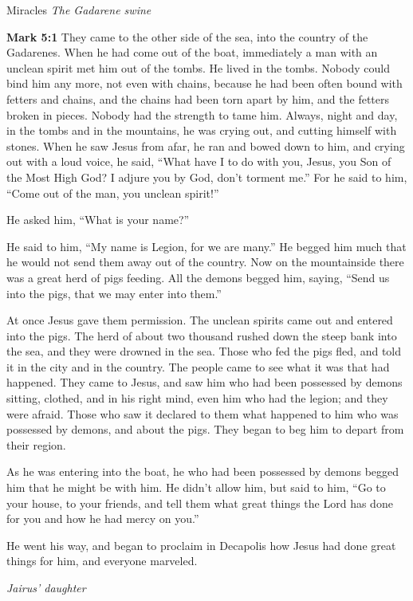 \documentclass[10pt,twoside]{book}
\newcommand{\quotesize}{\normalsize{}}
\newenvironment{quotetext}{\begingroup\quotesize}{\endgroup}
\newcommand{\bible}[2]{\begin{quotetext}\textbf{#1} #2\end{quotetext}}
\newcommand{\gospelmark}[2]{\bible{Mark #1}{#2}}
\newcommand{\subhead}[1]{\emph{#1}\par}
\begin{document}
\begin{section}{Miracles}
\subhead{The Gadarene swine}
\gospelmark{5:1}{
   They came to the other side of the sea, into the country of the Gadarenes.   When he had come out of the boat, immediately a man with an unclean spirit met him out of the tombs.   He lived in the tombs. Nobody could bind him any more, not even with chains,   because he had been often bound with fetters and chains, and the chains had been torn apart by him, and the fetters broken in pieces. Nobody had the strength to tame him.   Always, night and day, in the tombs and in the mountains, he was crying out, and cutting himself with stones.   When he saw Jesus from afar, he ran and bowed down to him,   and crying out with a loud voice, he said, ``What have I to do with you, Jesus, you Son of the Most High God? I adjure you by God, don't torment me.''   For he said to him, ``Come out of the man, you unclean spirit!''

  He asked him, ``What is your name?''

He said to him, ``My name is Legion, for we are many.''   He begged him much that he would not send them away out of the country.   Now on the mountainside there was a great herd of pigs feeding.   All the demons begged him, saying, ``Send us into the pigs, that we may enter into them.''

  At once Jesus gave them permission. The unclean spirits came out and entered into the pigs. The herd of about two thousand rushed down the steep bank into the sea, and they were drowned in the sea.   Those who fed the pigs fled, and told it in the city and in the country.
The people came to see what it was that had happened.   They came to Jesus, and saw him who had been possessed by demons sitting, clothed, and in his right mind, even him who had the legion; and they were afraid.   Those who saw it declared to them what happened to him who was possessed by demons, and about the pigs.   They began to beg him to depart from their region.

  As he was entering into the boat, he who had been possessed by demons begged him that he might be with him.   He didn't allow him, but said to him, ``Go to your house, to your friends, and tell them what great things the Lord has done for you and how he had mercy on you.''

  He went his way, and began to proclaim in Decapolis how Jesus had done great things for him, and everyone marveled.
}

\subhead{Jairus' daughter}


\end{section}
\end{document}

